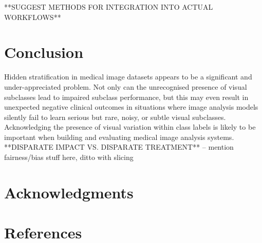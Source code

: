 \documentclass{article}
\begin{document}
 **SUGGEST METHODS FOR INTEGRATION INTO ACTUAL WORKFLOWS**


\section{Conclusion}

Hidden stratification in medical image datasets appears to be a significant and under-appreciated problem. Not only can the unrecognised presence of visual subclasses lead to impaired subclass performance, but this may even result in unexpected negative clinical outcomes in situations where image analysis models silently fail to learn serious but rare, noisy, or subtle visual subclasses.
Acknowledging the presence of visual variation within class labels is likely to be important when building and evaluating medical image analysis systems.
**DISPARATE IMPACT VS. DISPARATE TREATMENT** -- mention fairness/bias stuff here, ditto with slicing


\section*{Acknowledgments}

\section*{References}
\end{document}
